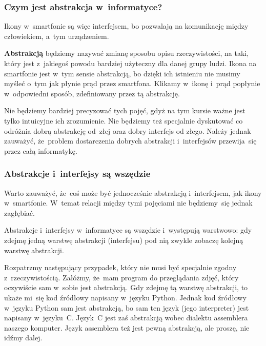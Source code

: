 \documentclass[10pt,t]{beamer}
\begin{document}
\begin{frame}
  \frametitle{Czym jest abstrakcja w~informatyce?}


  Ikony w~smartfonie są więc interfejsem, bo pozwalają na komunikację
  między człowiekiem, a~tym urządzeniem.

  \textbf{Abstrakcją} będziemy nazywać zmianę sposobu opisu rzeczywistości,
  na taki, który jest z~jakiegoś powodu bardziej użyteczny dla danej grupy
  ludzi. Ikona na smartfonie jest w~tym sensie abstrakcją, bo dzięki ich
  istnieniu nie musimy myśleć o~tym jak płynie prąd przez smartfona.
  Klikamy w~ikonę i~prąd popłynie w~odpowiedni sposób, zdefiniowany przez
  tą abstrakcję.

  Nie będziemy bardziej precyzować tych pojęć, gdyż na tym kursie ważne
  jest tylko intuicyjne ich zrozumienie. Nie będziemy też
  specjalnie dyskutować co odróżnia dobrą abstrakcję od~złej oraz dobry
  interfejs od złego. Należy jednak zauważyć, że~problem dostarczenia
  dobrych abstrakcji i~interfejsów przewija~się przez całą informatykę.

\end{frame}





\begin{frame}
  \frametitle{Abstrakcje i~interfejsy są wszędzie}


  Warto zauważyć, że~coś może być jednocześnie abstrakcją i~interfejsem,
  jak ikony w~smartfonie. W~temat relacji między tymi pojęciami nie
  będziemy~się jednak zagłębiać.

  Abstrakcje i~interfejsy w~informatyce są wszędzie i~występują warstwowo:
  gdy zdejmę jedną warstwę abstrakcji (interfejsu) pod nią zwykle zobaczę
  kolejną warstwę abstrakcji.

  Rozpatrzmy następujący przypadek, który nie musi być specjalnie zgodny
  z~rzeczywistością. Załóżmy, że~mam program do przeglądania zdjęć, który
  oczywiście sam w~sobie jest abstrakcją. Gdy zdejmę tą warstwę abstrakcji,
  to ukaże mi~się kod źródłowy napisany w~języku Python. Jednak kod
  źródłowy w~języku Python sam jest \alert{abstrakcją}, bo sam ten język
  (jego interpreter) jest napisany w~języku~C. Język~C jest zaś abstrakcją
  wobec dialektu assemblera naszego komputer. Język assemblera też jest
  pewną abstrakcją, ale proszę, nie idźmy dalej.

\end{frame}
\end{document}
